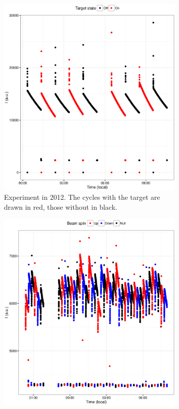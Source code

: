\documentclass[reprint]{revtex4-1}
\newcommand{\scl}{.4}
\begin{document}
\begin{figure}[h]
\begin{subfigure}{.5\textwidth}
\includegraphics[scale=\scl]{img/Cycles2012.eps}
\caption{Experiment in 2012. The cycles with the target are drawn in red, those without in black. \label{fig:Cycs2012}}
\end{subfigure}
\begin{subfigure}{.5\textwidth}
\includegraphics[scale=\scl]{img/Cycles2016.eps}

\end{subfigure}
\end{figure}
\end{document}
